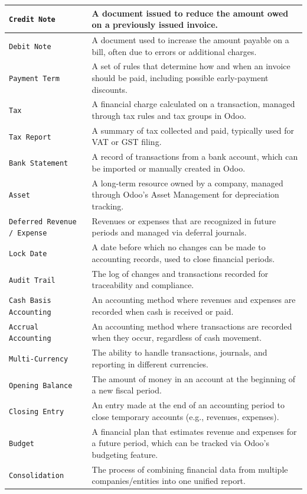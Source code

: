 \documentclass[11pt,a4paper]{article}
\begin{document}
\begin{longtable}{|l|p{10cm}|}
    \hline
    \texttt{Credit Note} & A document issued to reduce the amount owed on a previously issued invoice. \\
    \hline
    \texttt{Debit Note} & A document used to increase the amount payable on a bill, often due to errors or additional charges. \\
    \hline
    \texttt{Payment Term} & A set of rules that determine how and when an invoice should be paid, including possible early-payment discounts. \\
    \hline
    \texttt{Tax} & A financial charge calculated on a transaction, managed through tax rules and tax groups in Odoo. \\
    \hline
    \texttt{Tax Report} & A summary of tax collected and paid, typically used for VAT or GST filing. \\
    \hline
    \texttt{Bank Statement} & A record of transactions from a bank account, which can be imported or manually created in Odoo. \\
    \hline
    \texttt{Asset} & A long-term resource owned by a company, managed through Odoo’s Asset Management for depreciation tracking. \\
    \hline
    \texttt{Deferred Revenue / Expense} & Revenues or expenses that are recognized in future periods and managed via deferral journals. \\
    \hline
    \texttt{Lock Date} & A date before which no changes can be made to accounting records, used to close financial periods. \\
    \hline
    \texttt{Audit Trail} & The log of changes and transactions recorded for traceability and compliance. \\
    \hline
    \texttt{Cash Basis Accounting} & An accounting method where revenues and expenses are recorded when cash is received or paid. \\
    \hline
    \texttt{Accrual Accounting} & An accounting method where transactions are recorded when they occur, regardless of cash movement. \\
    \hline
    \texttt{Multi-Currency} & The ability to handle transactions, journals, and reporting in different currencies. \\
    \hline
    \texttt{Opening Balance} & The amount of money in an account at the beginning of a new fiscal period. \\
    \hline
    \texttt{Closing Entry} & An entry made at the end of an accounting period to close temporary accounts (e.g., revenues, expenses). \\
    \hline
    \texttt{Budget} & A financial plan that estimates revenue and expenses for a future period, which can be tracked via Odoo’s budgeting feature. \\
    \hline
    \texttt{Consolidation} & The process of combining financial data from multiple companies/entities into one unified report. \\
    \hline
\end{longtable}
\end{document}
